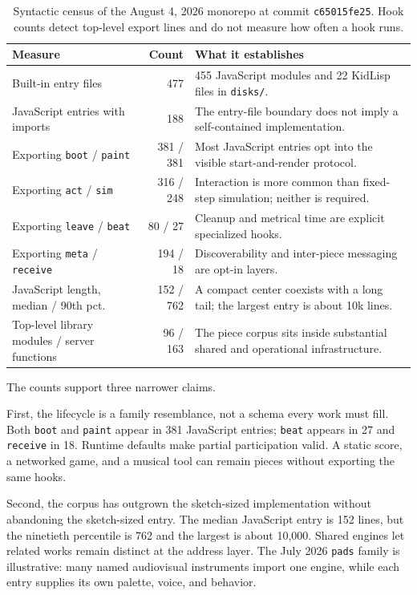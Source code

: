 \documentclass[10pt,letterpaper,twocolumn]{article}
\newcommand{\code}[1]{\texttt{#1}}
\begin{document}
\begin{table}[t]
\small
\centering
\begin{tabularx}{\textwidth}{l r X}
\toprule
\textbf{Measure} & \textbf{Count} & \textbf{What it establishes} \\
\midrule
Built-in entry files & 477 & 455 JavaScript modules and 22 KidLisp files in \code{disks/}. \\
JavaScript entries with imports & 188 & The entry-file boundary does not imply a self-contained implementation. \\
Exporting \code{boot} / \code{paint} & 381 / 381 & Most JavaScript entries opt into the visible start-and-render protocol. \\
Exporting \code{act} / \code{sim} & 316 / 248 & Interaction is more common than fixed-step simulation; neither is required. \\
Exporting \code{leave} / \code{beat} & 80 / 27 & Cleanup and metrical time are explicit specialized hooks. \\
Exporting \code{meta} / \code{receive} & 194 / 18 & Discoverability and inter-piece messaging are opt-in layers. \\
JavaScript length, median / 90th pct. & 152 / 762 & A compact center coexists with a long tail; the largest entry is about 10k lines. \\
Top-level library modules / server functions & 96 / 163 & The piece corpus sits inside substantial shared and operational infrastructure. \\
\bottomrule
\end{tabularx}
\caption{Syntactic census of the August 4, 2026 monorepo at commit \code{c65015fe25}. Hook counts detect top-level export lines and do not measure how often a hook runs.}
\label{tab:census}
\end{table}

The counts support three narrower claims.

First, the lifecycle is a family resemblance, not a schema every work must fill. Both \code{boot} and \code{paint} appear in 381 JavaScript entries; \code{beat} appears in 27 and \code{receive} in 18. Runtime defaults make partial participation valid. A static score, a networked game, and a musical tool can remain pieces without exporting the same hooks.

Second, the corpus has outgrown the sketch-sized implementation without abandoning the sketch-sized entry. The median JavaScript entry is 152 lines, but the ninetieth percentile is 762 and the largest is about 10,000. Shared engines let related works remain distinct at the address layer. The July 2026 \code{pads} family is illustrative: many named audiovisual instruments import one engine, while each entry supplies its own palette, voice, and behavior.
\end{document}

